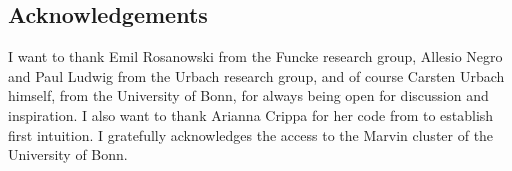 \begin{strip}
\section{Acknowledgements}
I want to thank Emil Rosanowski from the Funcke research group, Allesio Negro and Paul Ludwig from the Urbach research group, and of course Carsten Urbach himself, from the University of Bonn, for always being open for discussion and inspiration. I also want to thank Arianna Crippa for her code from \cite{crippa2024} to establish first intuition. 
I gratefully acknowledges the access to the Marvin cluster of the University of Bonn.
\end{strip}
